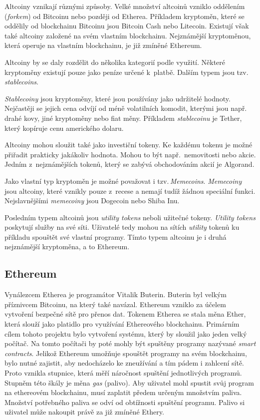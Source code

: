 \documentclass[12pt]{report}			%
\begin{document}
{{Altcoiny vznikají různými způsoby. Velké množství altcoinů vzniklo oddělením (\textit{forkem}) od Bitcoinu nebo později od Etherea. Příkladem kryptoměn, které se oddělily od blockchainu Bitcoinu jsou Bitcoin Cash nebo Litecoin. Existují však také altcoiny založené na svém vlastním blockchainu. Nejznámější kryptoměnou, která operuje na vlastním blockchainu, je již zmíněné Ethereum.

Altcoiny by se daly rozdělit do několika kategorií podle využití. Některé kryptoměny existují pouze jako peníze určené k~platbě. Dalším typem jsou tzv.\,\textit{stablecoins}. 

\textit{Stablecoiny} jsou kryptoměny, které jsou používány jako udržitelé hodnoty. Nejčastěji se jejich cena odvíjí od méně volatilních komodit, kterými jsou např.\,drahé kovy, jiné kryptoměny nebo fiat měny. Příkladem \textit{stablecoinu} je Tether, který kopíruje cenu amerického dolaru. 

Altcoiny mohou sloužit také jako investiční tokeny. Ke každému tokenu je možné přiřadit prakticky jakákoliv hodnota. Mohou to být např.\, nemovitosti nebo akcie. Jedním z~nejznámějších tokenů, který se zabývá obchodováním akcií je Algorand.

Jako vlastní typ kryptoměn je možné považovat i tzv.\,\textit{Memecoins}. \textit{Memecoiny} jsou altcoiny, které vznikly pouze z~recese a nemají tudíž žádnou speciální funkci. Nejslavnějšími \textit{memecoiny} jsou Dogecoin nebo Shiba Inu.

Posledním typem altcoinů jsou \textit{utility tokens} neboli užitečné tokeny. \textit{Utility tokens} poskytují služby na své síti. Uživatelé tedy mohou na sítích \textit{utility} tokenů ku příkladu spouštět své vlastní programy. Tímto typem altcoinu je i druhá nejznámější kryptoměna, a to Ethereum.
\cite{FrankenfieldALT}
}
		\subsection{Ethereum}{
Vynálezcem Etherea je programátor Vitalik Buterin. Buterin byl velkým příznivcem Bitcoinu, na který také navázal. Ethereum vzniklo za účelem vytvoření bezpečné sítě pro přenos dat. Tokenem Etherea se stala měna Ether, která slouží jako platidlo pro využívání Ethereového blockchainu. Primárním cílem tohoto projektu bylo vytvoření systému, který by sloužil jako jeden velký počítač. Na tomto počítači by poté mohly být spuštěny programy nazývané \textit{smart contracts}. Jelikož Ethereum umožňuje spouštět programy na svém blockchainu, bylo nutné zajistit, aby nedocházelo ke zneužívání a tím pádem i zahlcení sítě. Proto vznikla stupnice, která měří náročnost spuštění jednotlivých programů.  Stupněm této škály je měna \textit{gas} (palivo). Aby uživatel mohl spustit svůj program na ethereovém blockchainu, musí zaplatit předem určeným množstvím paliva. Množství potřebného paliva se odví od obtížnosti spuštění programu. Palivo si uživatel může nakoupit právě za již zmíněné Ethery.

}}
\end{document}
